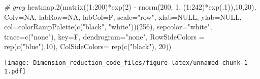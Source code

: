 \documentclass[
]{article}
\newenvironment{Shaded}{\begin{snugshade}}{\end{snugshade}}
\newcommand{\AttributeTok}[1]{\textcolor[rgb]{0.77,0.63,0.00}{#1}}
\newcommand{\CommentTok}[1]{\textcolor[rgb]{0.56,0.35,0.01}{\textit{#1}}}
\newcommand{\ConstantTok}[1]{\textcolor[rgb]{0.00,0.00,0.00}{#1}}
\newcommand{\DecValTok}[1]{\textcolor[rgb]{0.00,0.00,0.81}{#1}}
\newcommand{\FunctionTok}[1]{\textcolor[rgb]{0.00,0.00,0.00}{#1}}
\newcommand{\NormalTok}[1]{#1}
\newcommand{\SpecialCharTok}[1]{\textcolor[rgb]{0.00,0.00,0.00}{#1}}
\newcommand{\StringTok}[1]{\textcolor[rgb]{0.31,0.60,0.02}{#1}}
\begin{document}
\begin{Shaded}
\begin{Highlighting}[]
\CommentTok{\# grey}
\FunctionTok{heatmap.2}\NormalTok{(}\FunctionTok{matrix}\NormalTok{((}\DecValTok{1}\SpecialCharTok{:}\DecValTok{200}\NormalTok{)}\SpecialCharTok{*}\FunctionTok{exp}\NormalTok{(}\DecValTok{2}\NormalTok{) }\SpecialCharTok{{-}}  \FunctionTok{rnorm}\NormalTok{(}\DecValTok{200}\NormalTok{, }\DecValTok{1}\NormalTok{, (}\DecValTok{1}\SpecialCharTok{:}\DecValTok{242}\NormalTok{)}\SpecialCharTok{*}\FunctionTok{exp}\NormalTok{(.}\DecValTok{1}\NormalTok{)),}\DecValTok{10}\NormalTok{,}\DecValTok{20}\NormalTok{),}
          \AttributeTok{Colv=}\ConstantTok{NA}\NormalTok{, }\AttributeTok{labRow=}\ConstantTok{NA}\NormalTok{, }\AttributeTok{labCol=}\NormalTok{F, }\AttributeTok{scale=}\StringTok{"row"}\NormalTok{, }\AttributeTok{xlab=}\ConstantTok{NULL}\NormalTok{, }\AttributeTok{ylab=}\ConstantTok{NULL}\NormalTok{,}
          \AttributeTok{col=}\FunctionTok{colorRampPalette}\NormalTok{(}\FunctionTok{c}\NormalTok{(}\StringTok{"black"}\NormalTok{, }\StringTok{"white"}\NormalTok{))(}\DecValTok{256}\NormalTok{), }
        \AttributeTok{sepcolor=}\StringTok{"white"}\NormalTok{, }\AttributeTok{trace=}\FunctionTok{c}\NormalTok{(}\StringTok{"none"}\NormalTok{), }\AttributeTok{key=}\NormalTok{F, }\AttributeTok{dendrogram=}\StringTok{"none"}\NormalTok{,}
        \AttributeTok{RowSideColors =} \FunctionTok{rep}\NormalTok{(}\FunctionTok{c}\NormalTok{(}\StringTok{"blue"}\NormalTok{),}\DecValTok{10}\NormalTok{), }\AttributeTok{ColSideColors=}  \FunctionTok{rep}\NormalTok{(}\FunctionTok{c}\NormalTok{(}\StringTok{"black"}\NormalTok{), }\DecValTok{20}\NormalTok{))}
\end{Highlighting}
\end{Shaded}

\texttt{[image: Dimension\_reduction\_code\_files/figure-latex/unnamed-chunk-1-1.pdf]}
\end{document}
